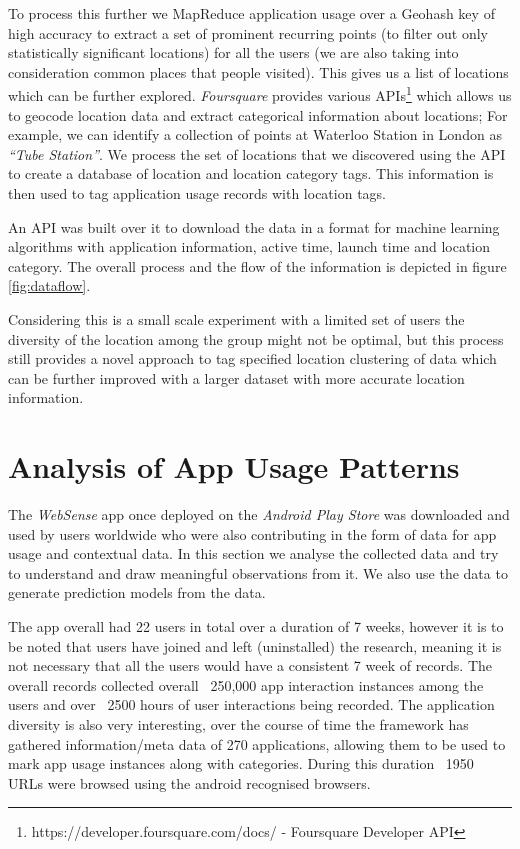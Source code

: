 \documentclass[prodmode,acmtecs]{acmsmall}
\begin{document}
To process this further we MapReduce application usage over a Geohash key of high accuracy to extract a set of prominent recurring points (to filter out only statistically significant locations) for all the users (we are also taking into consideration common places that people visited). This gives us a list of locations which can be further explored. \textit{Foursquare} provides various APIs\footnote{https://developer.foursquare.com/docs/ - Foursquare Developer API} which allows us to geocode location data and extract categorical information about locations; For example, we can identify a collection of points at Waterloo Station in London as \textit{``Tube Station''}. We process the set of locations that we discovered using the API to create a database of location and location category tags. This information is then used to tag application usage records with location tags. 

An API was built over it to download the data in a format for machine learning algorithms with application information, active time, launch time and location category. The overall process and the flow of the information is depicted in figure \ref{fig:dataflow}.

Considering this is a small scale experiment with a limited set of users the diversity of the location among the group might not be optimal, but this process still provides a novel approach to tag specified location clustering of data which can be further improved with a larger dataset with more accurate location information.


\section{Analysis of App Usage Patterns}
\label{anadata}

The \textit{WebSense} app once deployed on the \textit{Android Play Store} was downloaded and used by users worldwide who were also contributing in the form of data for app usage and contextual data. In this section we analyse the collected data and try to understand and draw meaningful observations from it. We also use the data to generate prediction models from the data.

The app overall had 22 users in total over a duration of 7 weeks, however it is to be noted that users have joined and left (uninstalled) the research, meaning it is not necessary that all the users would have a consistent 7 week of records. The overall records collected overall ~250,000 app interaction instances among the users and over ~2500 hours of user interactions being recorded. The application diversity is also very interesting, over the course of time the framework has gathered information/meta data of 270 applications, allowing them to be used to mark app usage instances along with categories. During this duration ~1950 URLs were browsed using the android recognised browsers.
\end{document}
